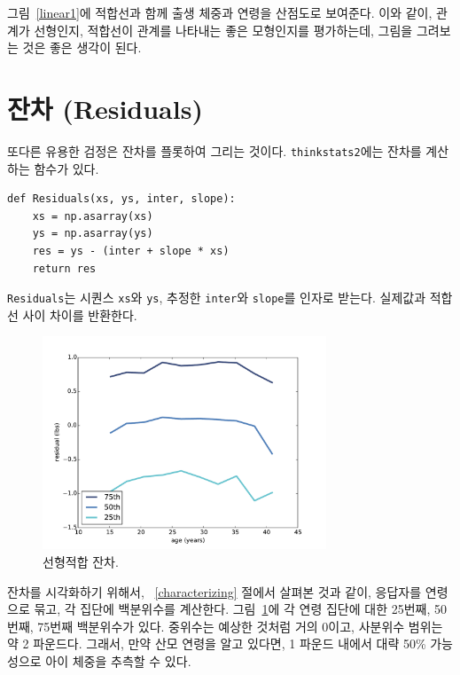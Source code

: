 그림~\ref{linear1}에 적합선과 함께 출생 체중과 연령을 산점도로 보여준다.
이와 같이, 관계가 선형인지, 적합선이 관계를 나타내는 좋은 모형인지를 평가하는데, 그림을 그려보는 것은 좋은 생각이 된다. 



\section{잔차 (Residuals)}
\label{residuals}

또다른 유용한 검정은 잔차를 플롯하여 그리는 것이다.
{\tt thinkstats2}에는 잔차를 계산하는 함수가 있다.

\begin{verbatim}
def Residuals(xs, ys, inter, slope):
    xs = np.asarray(xs)
    ys = np.asarray(ys)
    res = ys - (inter + slope * xs)
    return res
\end{verbatim}

{\tt Residuals}는 시퀀스 {\tt xs}와 {\tt ys}, 추정한 {\tt inter}와 {\tt slope}를 인자로 받는다. 실제값과 적합선 사이 차이를 반환한다.

\begin{figure}
\centerline{\includegraphics[height=2.5in]{figs/linear2.pdf}}
\caption{선형적합 잔차.}
\label{linear2}
\end{figure}

잔차를 시각화하기 위해서, ~\ref{characterizing} 절에서 살펴본 것과 같이, 응답자를 연령으로 묶고, 각 집단에 백분위수를 계산한다. 
그림~\ref{linear2}에 각 연령 집단에 대한 25번째, 50번째, 75번째 백분위수가 있다.
중위수는 예상한 것처럼 거의 0이고, 사분위수 범위는 약 2 파운드다. 그래서, 만약 산모 연령을 알고 있다면, 1 파운드 내에서 대략 50\% 가능성으로 아이 체중을 추측할 수 있다.

